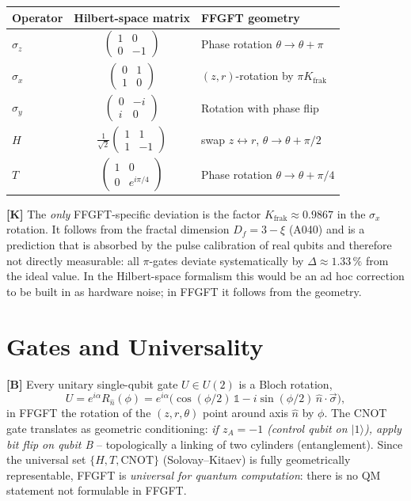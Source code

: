 \begin{center}
\renewcommand{\arraystretch}{1.4}
{\small
\begin{tabular}{lcl}
\toprule
\textbf{Operator} & \textbf{Hilbert-space matrix} & \textbf{FFGFT geometry} \\
\midrule
$\sigma_z$ & $\begin{pmatrix}1&0\\0&-1\end{pmatrix}$ & Phase rotation $\theta\to\theta+\pi$ \\
$\sigma_x$ & $\begin{pmatrix}0&1\\1&0\end{pmatrix}$ & $(z,r)$-rotation by $\pi K_{\text{frak}}$ \\
$\sigma_y$ & $\begin{pmatrix}0&-i\\i&0\end{pmatrix}$ & Rotation with phase flip \\
$H$ & $\tfrac{1}{\sqrt2}\begin{pmatrix}1&1\\1&-1\end{pmatrix}$ & swap $z\leftrightarrow r$, $\theta\to\theta+\pi/2$ \\
$T$ & $\begin{pmatrix}1&0\\0&e^{i\pi/4}\end{pmatrix}$ & Phase rotation $\theta\to\theta+\pi/4$ \\
\bottomrule
\end{tabular}
}
\renewcommand{\arraystretch}{1.0}
\end{center}

\textbf{[K]} The \emph{only} FFGFT-specific deviation is the factor
$K_{\text{frak}}\approx0{.}9867$ in the $\sigma_x$ rotation. It follows from the
fractal dimension $D_f = 3-\xi$ (A040) and is a prediction that is absorbed by the pulse calibration of real qubits and therefore not directly measurable: all
$\pi$-gates deviate systematically by $\Delta\approx1{.}33\,\%$ from the ideal
value. In the Hilbert-space formalism this would be an ad hoc correction to be
built in as hardware noise; in FFGFT it follows from the geometry.

\section{Gates and Universality}

\textbf{[B]} Every unitary single-qubit gate $U\in U(2)$ is a Bloch rotation,
\[
  U = e^{i\alpha}R_{\hat n}(\phi)
    = e^{i\alpha}\bigl(\cos(\phi/2)\,\mathbb{1} - i\sin(\phi/2)\,\hat n\cdot\vec\sigma\bigr),
\]
in FFGFT the rotation of the $(z,r,\theta)$ point around axis $\hat n$ by $\phi$.
The CNOT gate translates as geometric conditioning: \emph{if $z_A=-1$ (control
qubit on $|1\rangle$), apply bit flip on qubit B} -- topologically a linking of
two cylinders (entanglement). Since the universal set $\{H,T,\text{CNOT}\}$
(Solovay--Kitaev) is fully geometrically representable, FFGFT is \emph{universal
for quantum computation}: there is no QM statement not formulable in FFGFT.

